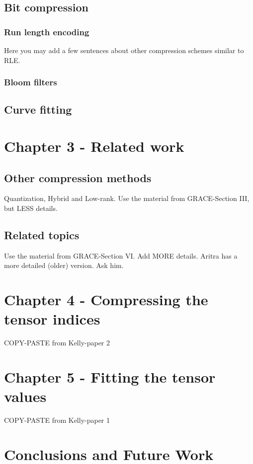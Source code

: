 \documentclass{article}
\begin{document}
\subsection{Bit compression}

\subsubsection{Run length encoding}
Here you may add a few sentences about other compression schemes similar to RLE.

\subsubsection{Bloom filters}

\subsection{Curve fitting}




\section{Chapter 3 - Related work}

\subsection{Other compression methods}
Quantization, Hybrid and Low-rank. Use the material from GRACE-Section III, but LESS details.

\subsection{Related topics}
Use the material from GRACE-Section VI. Add MORE details. Aritra has a more detailed (older) version. Ask him.



\section{Chapter 4 - Compressing the tensor indices}
COPY-PASTE from Kelly-paper 2


\section{Chapter 5 - Fitting the tensor values}
COPY-PASTE from Kelly-paper 1

\section{Conclusions and Future Work}
\end{document}
